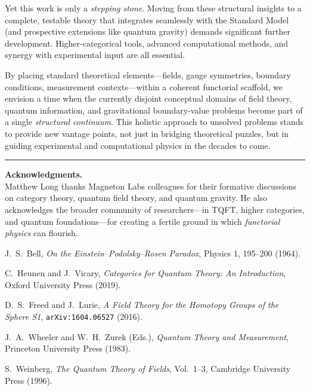 \documentclass[12pt]{article}
\begin{document}
Yet this work is only a \emph{stepping stone}. Moving from these structural insights to a complete, testable theory that integrates seamlessly with the Standard Model (and prospective extensions like quantum gravity) demands significant further development. Higher-categorical tools, advanced computational methods, and synergy with experimental input are all essential.

By placing standard theoretical elements---fields, gauge symmetries, boundary conditions, measurement contexts---within a coherent functorial scaffold, we envision a time when the currently disjoint conceptual domains of field theory, quantum information, and gravitational boundary-value problems become part of a single \emph{structural continuum}. This holistic approach to unsolved problems stands to provide new vantage points, not just in bridging theoretical puzzles, but in guiding experimental and computational physics in the decades to come.

\bigskip
\hrule
\bigskip

\noindent \textbf{Acknowledgments.}\\
Matthew Long thanks Magneton Labs colleagues for their formative discussions on category theory, quantum field theory, and quantum gravity. 
He also acknowledges the broader community of researchers---in TQFT, higher categories, and quantum foundations---for creating a fertile ground in which \emph{functorial physics} can flourish.

\vspace{1em}

\begin{thebibliography}{9}

J.~S.~Bell, 
\emph{On the Einstein--Podolsky--Rosen Paradox},
Physics 1, 195--200 (1964).

C.~Heunen and J.~Vicary, 
\emph{Categories for Quantum Theory: An Introduction},
Oxford University Press (2019).

D.~S.~Freed and J.~Lurie,
\emph{A Field Theory for the Homotopy Groups of the Sphere S1},
\texttt{arXiv:1604.06527} (2016).

J.~A.~Wheeler and W.~H.~Zurek (Eds.), 
\emph{Quantum Theory and Measurement},
Princeton University Press (1983).

S.~Weinberg, 
\emph{The Quantum Theory of Fields}, Vol.\ 1--3,
Cambridge University Press (1996).

\end{thebibliography}
\end{document}
